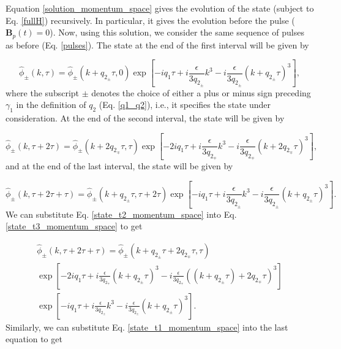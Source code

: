 \documentclass{article}
\begin{document}
Equation \ref{solution_momentum_space} gives the evolution of the state (subject to Eq. \ref{fullH}) recursively. In particular, it gives the evolution before the pulse ($\textbf{B}_p(t) = 0$). Now, using this solution, we consider the same sequence of pulses as before (Eq. \ref{pulses}). The state at the end of the first interval will be given by

\begin{equation}\label{state_t1_momentum_space}
\widehat{\phi}_{\pm}(k, \tau) = \widehat{\phi}_{\pm}(k + q_{2_{\pm}}\tau, 0) \exp \left[-i q_{1} \tau + i \frac{\epsilon}{3q_{2_{\pm}}} k^{3} - i \frac{\epsilon}{3q_{2_{\pm}}} (k + q_{2_{\pm}} \tau)^{3} \right],
\end{equation}
%
where the subscript $\pm$ denotes the choice of either a plus or minus sign preceding $\gamma_{1}$ in the definition of $q_{2}$ (Eq. \ref{q1_q2}), i.e., it specifies the state under consideration. At the end of the second interval, the state will be given by

\begin{equation}\label{state_t2_momentum_space}
\widehat{\phi}_{\pm}(k, \tau+2\tau) = \widehat{\phi}_{\pm}(k + 2q_{2_{\mp}}\tau, \tau) \exp\left[-2i q_{1} \tau + i \frac{\epsilon}{3q_{2_{\mp}}} k^{3} - i \frac{\epsilon}{3q_{2_{\mp}}} (k + 2q_{2_{\mp}} \tau)^{3} \right],
\end{equation}
%
and at the end of the last interval, the state will be given by

\begin{equation}\label{state_t3_momentum_space}
\widehat{\phi}_{\pm}(k, \tau+2\tau+\tau) = \widehat{\phi}_{\pm}(k + q_{2_{\pm}}\tau, \tau+2\tau) \exp\left[-i q_{1} \tau + i \frac{\epsilon}{3q_{2_{\pm}}} k^{3} - i \frac{\epsilon}{3q_{2_{\pm}}} (k + q_{2_{\pm}} \tau)^{3} \right].
\end{equation}
%
We can substitute Eq. \ref{state_t2_momentum_space} into Eq. \ref{state_t3_momentum_space} to get

\begin{multline}\label{state_t3_momentum_space_2}
\widehat{\phi}_{\pm}(k, \tau+2\tau+\tau) = \widehat{\phi}_{\pm}(k + q_{2_{\pm}}\tau + 2q_{2_{\mp}}\tau, \tau)  \\ 
\exp\left[-2i q_{1} \tau + i \frac{\epsilon}{3q_{2_{\mp}}} (k+q_{2_{\pm}}\tau)^{3} - i \frac{\epsilon}{3q_{2_{\mp}}} ((k+ q_{2_{\pm}}\tau) + 2q_{2_{\mp}} \tau)^{3} \right] \\
\exp\left[-i q_{1} \tau + i \frac{\epsilon}{3q_{2_{\pm}}} k^{3} - i \frac{\epsilon}{3q_{2_{\pm}}} (k + q_{2_{\pm}} \tau)^{3} \right].
\end{multline}
%
Similarly, we can substitute Eq. \ref{state_t1_momentum_space} into the last equation to get
\end{document}
